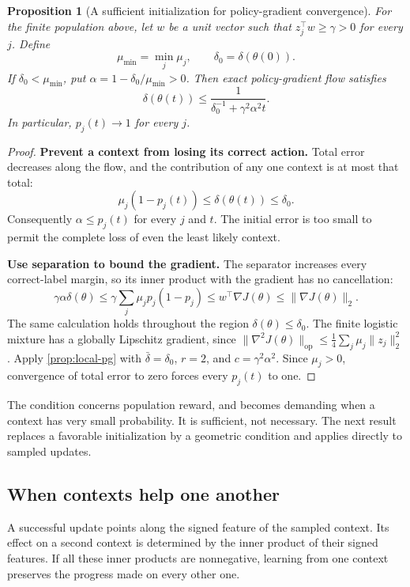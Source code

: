 \documentclass[11pt,twoside]{article}
\newtheorem{proposition}[theorem]{Proposition}
\theoremstyle{definition}
\theoremstyle{remark}
\begin{document}
\begin{proposition}[A sufficient initialization for policy-gradient convergence]
\label{prop:initialized-pg}
For the finite population above, let $w$ be a unit vector such that
$z_j^\top w\ge\gamma>0$ for every $j$. Define
\[
 \mu_{\min}=\min_j\mu_j,\qquad
 \delta_0=\delta(\theta(0)).
\]
If $\delta_0<\mu_{\min}$, put $\alpha=1-\delta_0/\mu_{\min}>0$.
Then exact policy-gradient flow satisfies
\[
 \delta(\theta(t))\le
 \frac{1}{\delta_0^{-1}+\gamma^2\alpha^2t}.
\]
In particular, $p_j(t)\to1$ for every $j$.
\end{proposition}
\begin{proof}
\textbf{Prevent a context from losing its correct action.}
Total error decreases along the flow, and the contribution of any one
context is at most that total:
\[
 \mu_j(1-p_j(t))\le\delta(\theta(t))\le \delta_0.
\]
Consequently $\alpha\le p_j(t)$ for every $j$ and $t$.
The initial error is too small to permit the complete loss of even the
least likely context.

\textbf{Use separation to bound the gradient.}
The separator increases every correct-label margin, so its inner product
with the gradient has no cancellation:
\[
 \gamma\alpha\delta(\theta)
 \le\gamma\sum_j\mu_jp_j(1-p_j)
 \le w^\top\nabla J(\theta)
 \le\|\nabla J(\theta)\|_2.
\]
The same calculation holds throughout the region $\delta(\theta)\le \delta_0$.
The finite logistic mixture has a globally Lipschitz gradient, since
$\|\nabla^2J(\theta)\|_{\mathrm{op}}
\le\frac14\sum_j\mu_j\|z_j\|_2^2$.
Apply \cref{prop:local-pg} with $\bar\delta=\delta_0$, $r=2$, and
$c=\gamma^2\alpha^2$.
Since $\mu_j>0$, convergence of total error to zero forces every
$p_j(t)$ to one.
\end{proof}

The condition concerns population reward, and becomes demanding when a
context has very small probability. It is sufficient, not necessary.
The next result replaces a favorable initialization by a geometric
condition and applies directly to sampled updates.

\subsection{When contexts help one another}
\label{sec:nonnegative-pg}

A successful update points along the signed feature of the sampled
context. Its effect on a second context is determined by the inner product
of their signed features. If all these inner products are nonnegative,
learning from one context preserves the progress made on every other one.
\end{document}
